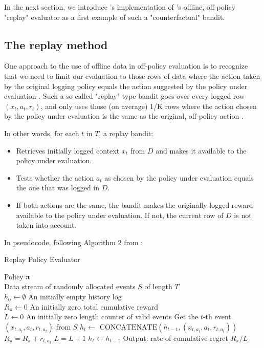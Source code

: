 \documentclass{jss}
\begin{document}
In the next section, we introduce 's implementation of \cite{Li2011}'s offline, off-policy "replay" \citep{Nicol2014} evaluator as a first example of such a "counterfactual" bandit.

\subsection{The replay method} \label{offli}

One approach to the use of offline data in off-policy evaluation is to recognize that we need to limit our evaluation to those rows of data where the action taken by the original logging policy equals the action suggested by the policy under evaluation \citep{Li2012,Li2011}. Such a so-called "replay" type bandit goes over every logged row \((x_{t},a_{t},r_{t})\), and only uses those (on average) 1/K rows where the action chosen by the policy under evaluation is the same as the original, off-policy action \citep{Nicol2014}.

In other words, for each $t$ in $T$, a replay bandit:

\begin{itemize}
   \item{Retrieves initially logged context $x_{t}$ from $D$ and makes it available to the policy under evaluation.}
   \item{Tests whether the action $a_{t}$ as chosen by the policy under evaluation equals the one that was logged in $D$.}
   \item{If both actions are the same, the bandit makes the originally logged reward available to the policy under evaluation. If not, the current row of $D$ is not taken into account. }
\end{itemize}

In pseudocode, following Algorithm 2 from \cite{Li2011}:

\begin{algorithm}[H]
\caption{Replay Policy Evaluator}
\label{Alg:LiBandit}
\begin{algorithmic}
\REQUIRE  Policy $\piup$ \\
                 Data stream of randomly allocated events $S$ of length $T$  \\
                 $h_0 \leftarrow \emptyset$ {An initially empty history log}\\
                 $R_\pi \leftarrow 0$ {An initially zero total cumulative reward}\\
                 $L \leftarrow 0$ {An initially zero length counter of valid events}
	\STATE Get the $t$-th event \( (x_{t,a_t},a_{t},r_{t,a_t}) \) from  $S$
	       \STATE $h_{t} \leftarrow $  \(\textrm{CONCATENATE}\left( h_{t-1},(x_{t,a_t},a_{t},r_{t,a_t})  \right)\)
	       \STATE $R_\pi = R_\pi + r_{t,a_t}$
	       \STATE $L = L + 1$
	\ELSE
	        \STATE $h_{t} \leftarrow  h_{t-1} $
	\ENDIF
\ENDFOR
\STATE Output: rate of cumulative regret $R_\pi / L $
\end{algorithmic}
\end{algorithm}
\end{document}

